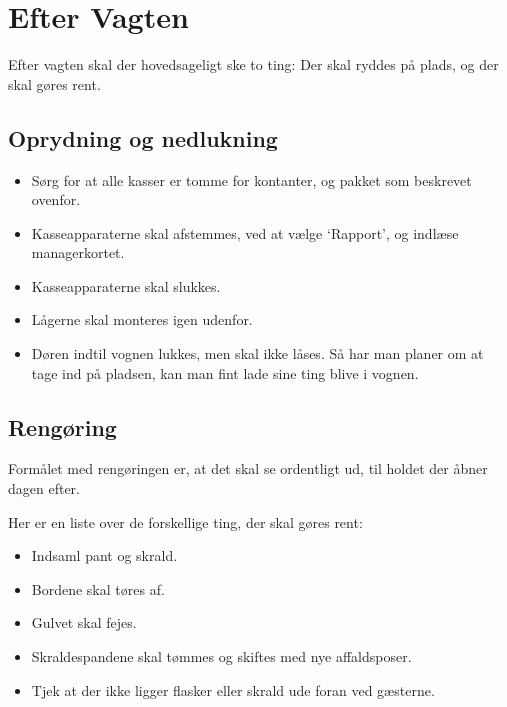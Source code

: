 \section{Efter Vagten}
\label{sec:post-barvagten}

Efter vagten skal der hovedsageligt ske to ting: Der skal ryddes på
plads, og der skal gøres rent.

\subsection{Oprydning og nedlukning}
\label{sec:post:oprydning}

\begin{itemize}
	\item Sørg for at alle kasser er tomme for kontanter, og pakket som beskrevet ovenfor.
	\item Kasseapparaterne skal afstemmes, ved at vælge `Rapport', og indlæse managerkortet.
	\item Kasseapparaterne skal slukkes.
	\item Lågerne skal monteres igen udenfor.
	\item Døren indtil vognen lukkes, men skal ikke låses. Så har man planer om at tage ind på pladsen, 
	kan man fint lade sine ting blive i vognen.
\end{itemize}

\subsection{Rengøring}
\label{sec:post:rengoring}

Formålet med rengøringen er, at det skal se ordentligt ud, til 
holdet der åbner dagen efter.

Her er en liste over de forskellige ting, der skal gøres rent:
\begin{itemize}
	\item Indsaml pant og skrald.
	\item Bordene skal tøres af.
	\item Gulvet skal fejes.
	\item Skraldespandene skal tømmes og skiftes med nye affaldsposer.
	\item Tjek at der ikke ligger flasker eller skrald ude foran ved gæsterne.
\end{itemize}
